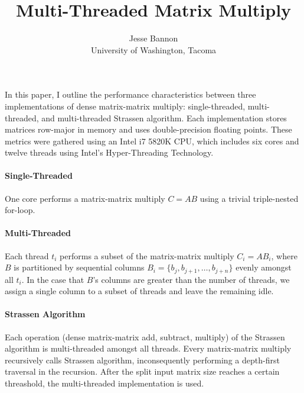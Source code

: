 \documentclass{article}
\begin{document}
\title{Multi-Threaded Matrix Multiply}
\author{Jesse Bannon\\
University of Washington, Tacoma}
\renewcommand{\today}{July 2, 2017}
\maketitle

In this paper, I outline the performance characteristics between three implementations of dense matrix-matrix multiply: single-threaded, multi-threaded, and multi-threaded Strassen algorithm. Each implementation stores matrices row-major in memory and uses double-precision floating points. These metrics were gathered using an Intel i7 5820K CPU, which includes six cores and twelve threads using Intel's Hyper-Threading Technology.

\paragraph{Single-Threaded}
One core performs a matrix-matrix multiply $C = AB$ using a trivial triple-nested for-loop.

\paragraph{Multi-Threaded}
Each thread $t_{i}$ performs a subset of the matrix-matrix multiply $C_{i} = AB_{i}$, where $B$ is partitioned by sequential columns $B_{i} = \lbrace b_{j}, b_{j+1}, \dots, b_{j+n} \rbrace$ evenly amongst all $t_{i}$. In the case that $B$'s columns are greater than the number of threads, we assign a single column to a subset of threads and leave the remaining idle.

\paragraph{Strassen Algorithm}
Each operation (dense matrix-matrix add, subtract, multiply) of the Strassen algorithm is multi-threaded amongst all threads. Every matrix-matrix multiply recursively calls Strassen algorithm, inconsequently performing a depth-first traversal in the recursion. After the split input matrix size reaches a certain threashold, the multi-threaded implementation is used.
\end{document}
